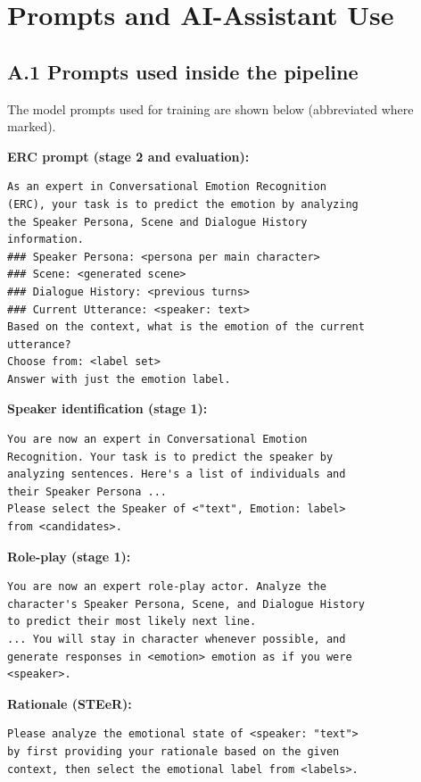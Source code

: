\documentclass[lettersize,journal]{IEEEtran}
\begin{document}
\appendices
\section{Prompts and AI-Assistant Use}

\subsection*{A.1 Prompts used inside the pipeline}
The model prompts used for training are shown below (abbreviated where marked).

\noindent\textbf{ERC prompt (stage 2 and evaluation):}
\begin{small}\begin{verbatim}
As an expert in Conversational Emotion Recognition
(ERC), your task is to predict the emotion by analyzing
the Speaker Persona, Scene and Dialogue History
information.
### Speaker Persona: <persona per main character>
### Scene: <generated scene>
### Dialogue History: <previous turns>
### Current Utterance: <speaker: text>
Based on the context, what is the emotion of the current
utterance?
Choose from: <label set>
Answer with just the emotion label.
\end{verbatim}\end{small}

\noindent\textbf{Speaker identification (stage 1):}
\begin{small}\begin{verbatim}
You are now an expert in Conversational Emotion
Recognition. Your task is to predict the speaker by
analyzing sentences. Here's a list of individuals and
their Speaker Persona ...
Please select the Speaker of <"text", Emotion: label>
from <candidates>.
\end{verbatim}\end{small}

\noindent\textbf{Role-play (stage 1):}
\begin{small}\begin{verbatim}
You are now an expert role-play actor. Analyze the
character's Speaker Persona, Scene, and Dialogue History
to predict their most likely next line.
... You will stay in character whenever possible, and
generate responses in <emotion> emotion as if you were
<speaker>.
\end{verbatim}\end{small}

\noindent\textbf{Rationale (STEeR):}
\begin{small}\begin{verbatim}
Please analyze the emotional state of <speaker: "text">
by first providing your rationale based on the given
context, then select the emotional label from <labels>.
\end{verbatim}\end{small}
\end{document}
